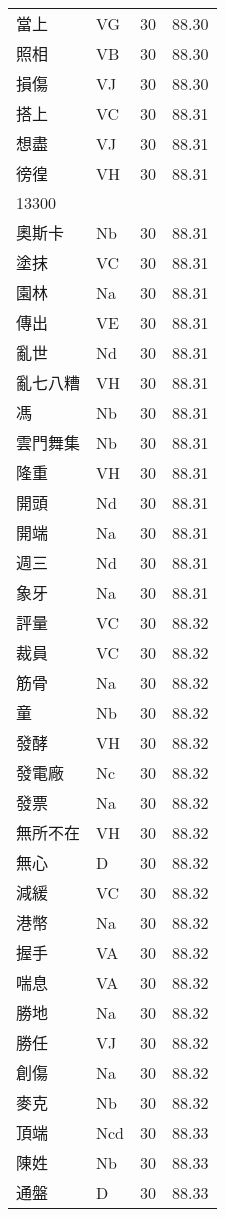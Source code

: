 \documentclass[twocolumn]{book}
\begin{document}
\begin{supertabular}{llrr}
當上 & VG & 30 &  88.30\\
照相 & VB & 30 &  88.30\\
損傷 & VJ & 30 &  88.30\\
搭上 & VC & 30 &  88.31\\
想盡 & VJ & 30 &  88.31\\
徬徨 & VH & 30 &  88.31\\
13300\\
奧斯卡 & Nb & 30 &  88.31\\
塗抹 & VC & 30 &  88.31\\
園林 & Na & 30 &  88.31\\
傳出 & VE & 30 &  88.31\\
亂世 & Nd & 30 &  88.31\\
亂七八糟 & VH & 30 &  88.31\\
馮 & Nb & 30 &  88.31\\
雲門舞集 & Nb & 30 &  88.31\\
隆重 & VH & 30 &  88.31\\
開頭 & Nd & 30 &  88.31\\
開端 & Na & 30 &  88.31\\
週三 & Nd & 30 &  88.31\\
象牙 & Na & 30 &  88.31\\
評量 & VC & 30 &  88.32\\
裁員 & VC & 30 &  88.32\\
筋骨 & Na & 30 &  88.32\\
童 & Nb & 30 &  88.32\\
發酵 & VH & 30 &  88.32\\
發電廠 & Nc & 30 &  88.32\\
發票 & Na & 30 &  88.32\\
無所不在 & VH & 30 &  88.32\\
無心 & D & 30 &  88.32\\
減緩 & VC & 30 &  88.32\\
港幣 & Na & 30 &  88.32\\
握手 & VA & 30 &  88.32\\
喘息 & VA & 30 &  88.32\\
勝地 & Na & 30 &  88.32\\
勝任 & VJ & 30 &  88.32\\
創傷 & Na & 30 &  88.32\\
麥克 & Nb & 30 &  88.32\\
頂端 & Ncd & 30 &  88.33\\
陳姓 & Nb & 30 &  88.33\\
通盤 & D & 30 &  88.33\\

\end{supertabular}
\end{document}
